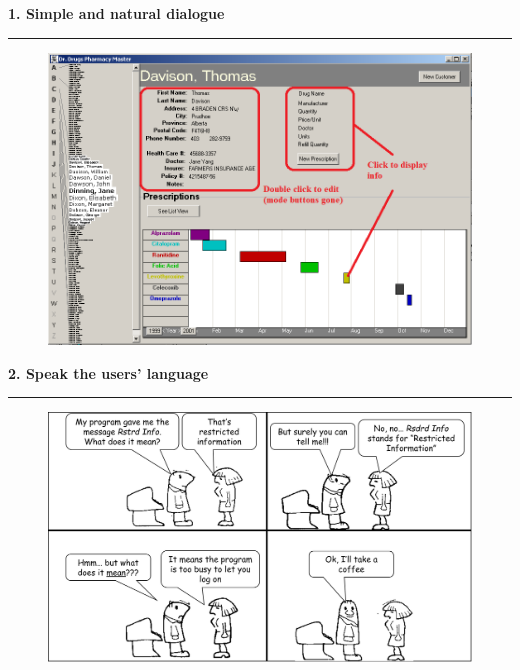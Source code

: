 \documentclass[pdf]{beamer}
\begin{document}
\begin{frame}
{\textbf{1. Simple and natural dialogue}}{\textcolor{red}{\rule{12cm}{1.2pt}}}

	\begin{figure}[b]
      \includegraphics[scale = 0.47]{12_Picture1.png}
  	\end{figure}
   
 	\fontsize{4pt}{0.5pt}
\end{frame}



\begin{frame}
{\textbf{2. Speak the users' language}}{\textcolor{red}{\rule{12cm}{1.2pt}}}

\begin{figure}
 \includegraphics[scale = 0.45]{13_Picture1.png}
\end{figure}

\end{frame}
\end{document}
